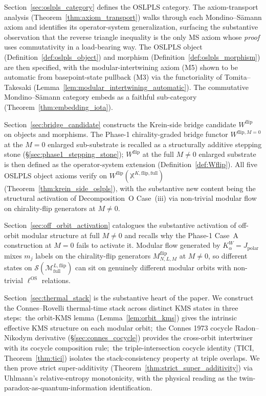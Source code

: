 \documentclass[11pt,a4paper]{article}
\theoremstyle{plain}
\theoremstyle{definition}
\newcommand{\Scal}{\mathcal{S}}
\newcommand{\Mcal}{\mathcal{M}}
\newcommand{\Kalpha}{K_{\alpha}^{W}}
\newcommand{\ellOS}{\ell^{\mathrm{OS}}}
\newcommand{\Mflipfull}{\Mcal^{L,\mathrm{flip}}_{\mathrm{full}}}
\newcommand{\Wflip}{W^{\mathrm{flip}}}
\newcommand{\WflipMzero}{W^{\mathrm{flip},M=0}}
\newcommand{\Mflip}[3]{M^{\mathrm{flip}}_{#1,#2,#3}}
\newcommand{\osXkrein}{\mathbb{X}^{K,\mathrm{flip},\mathrm{full}}}
\begin{document}
Section~\ref{sec:oslpls_category} defines the OSLPLS category. The
axiom-transport analysis (Theorem~\ref{thm:axiom_transport}) walks
through each Mondino--S\"amann axiom and identifies its
operator-system generalization, surfacing the substantive observation
that the reverse triangle inequality is the only MS axiom whose
\emph{proof} uses commutativity in a load-bearing way. The OSLPLS
object (Definition~\ref{def:oslpls_object}) and morphism
(Definition~\ref{def:oslpls_morphism}) are then specified, with the
modular-intertwining axiom (M5) shown to be automatic from
basepoint-state pullback (M3) via the functoriality of
Tomita--Takesaki (Lemma~\ref{lem:modular_intertwining_automatic}).
The commutative Mondino--S\"amann category embeds as a faithful
sub-category (Theorem~\ref{thm:embedding_iota}).

Section~\ref{sec:bridge_candidate} constructs the Krein-side bridge
candidate $\Wflip$ on objects and morphisms. The Phase-1
chirality-graded bridge functor $\WflipMzero$ at the $M=0$ enlarged
sub-substrate is recalled as a structurally additive stepping stone
(\S\ref{sec:phase1_stepping_stone}); $\Wflip$ at the full $M\ne 0$
enlarged substrate is then defined as the operator-system extension
(Definition~\ref{def:Wflip}). All five OSLPLS object axioms verify
on $\Wflip(\osXkrein)$ (Theorem~\ref{thm:krein_side_oslpls}), with
the substantive new content being the structural activation of
Decomposition~O Case~(iii) via non-trivial modular flow on
chirality-flip generators at $M\ne 0$.

Section~\ref{sec:off_orbit_activation} catalogues the substantive
activation of off-orbit modular structure at full $M\ne 0$ and
recalls why the Phase-1 Case~A construction at $M=0$ fails to
activate it. Modular flow generated by $\Kalpha=J_{\mathrm{polar}}$
mixes $m_{j}$ labels on the chirality-flip generators
$\Mflip{N}{L}{M}$ at $M\ne 0$, so different states on
$\Scal(\Mflipfull)$ can sit on genuinely different modular orbits
with non-trivial $\ellOS$ relations.

Section~\ref{sec:thermal_stack} is the substantive heart of the
paper. We construct the Connes--Rovelli thermal-time stack across
distinct KMS states in three steps:\ the orbit-KMS lemma
(Lemma~\ref{lem:orbit_kms}) gives the intrinsic effective KMS
structure on each modular orbit;\ the Connes 1973 cocycle
Radon--Nikodym derivative (\S\ref{sec:connes_cocycle}) provides the
cross-orbit intertwiner with its cocycle composition rule;\ the
triple-intersection cocycle identity (TICI, Theorem~\ref{thm:tici})
isolates the stack-consistency property at triple overlaps. We then
prove strict super-additivity
(Theorem~\ref{thm:strict_super_additivity}) via Uhlmann's
relative-entropy monotonicity, with the physical reading as the
twin-paradox-as-quantum-information identification.
\end{document}
